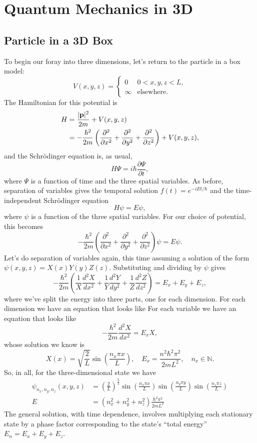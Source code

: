 \documentclass[../p052main.tex]{subfiles}
\begin{document}
\chapter{Quantum Mechanics in 3D}
\section{Particle in a 3D Box}
To begin our foray into three dimensions, let's return to the particle in a box model:
\[ V(x,y,z) = \begin{cases} 0 & 0 < x,y,z < L, \\ \infty & \text{elsewhere}. \end{cases} \]
The Hamiltonian for this potential is   
\begin{align*}
    H &= \frac{|\mathbf{p}|^2}{2m} + V(x,y,z) \\
    &= -\frac{\hbar^2}{2m} \left( \frac{\partial^2}{\partial x^2} + \frac{\partial^2}{\partial y^2} + \frac{\partial^2}{\partial z^2} \right) + V(x,y,z),
\end{align*}
and the Schrödinger equation is, as usual,
\[ H \Psi = i \hbar \frac{\partial \Psi}{\partial t}, \]
where $\Psi$ is a function of time and the three spatial variables.
As before, separation of variables gives the temporal solution $f(t) = e^{-iEt / \hbar}$ and the time-independent Schrödinger equation
\[ H \psi = E \psi, \]
where $\psi$ is a function of the three spatial variables.
For our choice of potential, this becomes
\[ -\frac{\hbar^2}{2m} \left( \frac{\partial^2}{\partial x^2} + \frac{\partial^2}{\partial y^2} + \frac{\partial^2}{\partial z^2} \right) \psi = E \psi. \]
Let's do separation of variables again, this time assuming a solution of the form $\psi(x,y,z) = X(x) Y(y) Z(z)$.
Substituting and dividing by $\psi$ gives
\[ -\frac{\hbar^2}{2m} \left( \frac{1}{X} \frac{d^2 X}{d x^2} + \frac{1}{Y} \frac{d^2 Y}{d y^2} + \frac{1}{Z} \frac{d^2 Z}{d z^2} \right) = E_x + E_y + E_z, \]
where we've split the energy into three parts, one for each dimension.
For each dimension we have an equation that looks like
For each variable we have an equation that looks like
\[ -\frac{\hbar^2}{2m} \frac{d^2 X}{d x^2} = E_x X, \]
whose solution we know is
\[ X(x) = \sqrt{\frac{2}{L}} \sin \left( \frac{n_x \pi x}{L} \right), \quad E_x = \frac{n^2 \hbar^2 \pi^2}{2mL^2}, \quad n_x \in \mathbb{N}. \]
So, in all, for the three-dimensional state we have
\begin{align*}
    \psi_{n_x, n_y, n_z}(x,y,z) &= \left( \frac{2}{L} \right)^{\frac{3}{2}} \sin \left( \frac{n_x \pi x}{L} \right) \sin \left( \frac{n_y \pi y}{L} \right) \sin \left( \frac{n_z \pi z}{L} \right) \\
    E &= \left( n_x^2 + n_y^2 + n_z^2 \right) \frac{\hbar^2 \pi^2}{2mL^2}
\end{align*}
The general solution, with time dependence, involves multiplying each stationary state by a phase factor corresponding to the state's ``total energy'' $E_n = E_x + E_y + E_z$.
\end{document}
